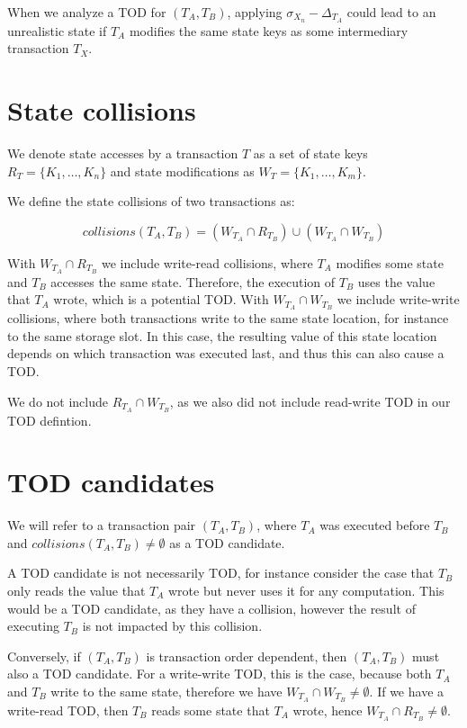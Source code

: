 \documentclass[draft,final]{vutinfth} %
\begin{document}
When we analyze a TOD for $(T_A, T_B)$, applying $\sigma_{X_n} - \Delta_{T_A}$ could lead to an unrealistic state if $T_A$ modifies the same state keys as some intermediary transaction $T_X$.

\section{State collisions}

We denote state accesses by a transaction $T$ as a set of state keys $R_T = \{ K_1, \dots, K_n \}$ and state modifications as $W_T = \{ K_1, \dots, K_m \}$.

We define the state collisions of two transactions as:

$$collisions(T_A, T_B) = (W_{T_A} \cap R_{T_B}) \cup (W_{T_A} \cap W_{T_B})$$

With $W_{T_A} \cap R_{T_B}$ we include write-read collisions, where $T_A$ modifies some state and $T_B$ accesses the same state. Therefore, the execution of $T_B$ uses the value that $T_A$ wrote, which is a potential TOD. With $W_{T_A} \cap W_{T_B}$ we include write-write collisions, where both transactions write to the same state location, for instance to the same storage slot. In this case, the resulting value of this state location depends on which transaction was executed last, and thus this can also cause a TOD.

We do not include $R_{T_A} \cap W_{T_B}$, as we also did not include read-write TOD in our TOD defintion.

\section{TOD candidates}

We will refer to a transaction pair $(T_A, T_B)$, where $T_A$ was executed before $T_B$ and $collisions(T_A, T_B) \neq \emptyset$ as a TOD candidate.

A TOD candidate is not necessarily TOD, for instance consider the case that $T_B$ only reads the value that $T_A$ wrote but never uses it for any computation. This would be a TOD candidate, as they have a collision, however the result of executing $T_B$ is not impacted by this collision.

Conversely, if $(T_A, T_B)$ is transaction order dependent, then $(T_A, T_B)$ must also a TOD candidate. For a write-write TOD, this is the case, because both $T_A$ and $T_B$ write to the same state, therefore we have $W_{T_A} \cap W_{T_B} \neq \emptyset$. If we have a write-read TOD, then $T_B$ reads some state that $T_A$ wrote, hence $W_{T_A} \cap R_{T_B} \neq \emptyset$.
\end{document}
